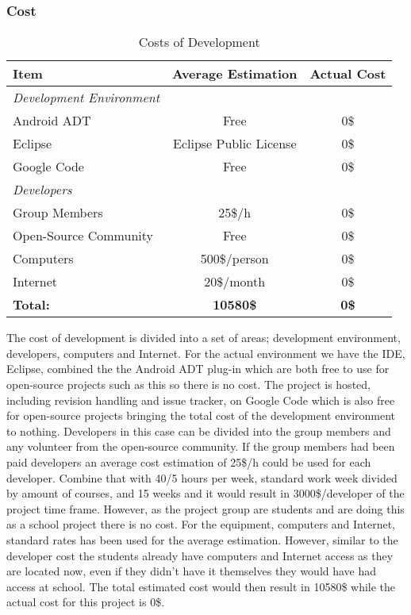 \subsubsection{Cost}
\begin{table}[h]
\label{tab:dev_costs}
\begin{center}
    \begin{tabular}{ | l | c | c |}
    \hline
    \textbf{Item} & \textbf{Average Estimation} & \textbf{Actual Cost} \\ \hline
    \textit{Development Environment} &  &  \\ 
    Android ADT & Free & 0\$ \\ 
    Eclipse & Eclipse Public License\cite{eclipse-cost} & 0\$ \\
    Google Code & Free & 0\$ \\ \hline
    \textit{Developers} &  &  \\
    Group Members & 25\$/h\cite{dev-cost} & 0\$ \\
    Open-Source Community & Free & 0\$ \\ \hline
    Computers & 500\$/person\cite{comp-cost} & 0\$ \\ \hline
    Internet & 20\$/month\cite{internet-cost} & 0\$ \\ \hline \hline
    \textbf{Total:} & \textbf{10580\$} & \textbf{0\$} \\ \hline
    \end{tabular}
    \caption{Costs of Development}
\end{center}
\end{table}
The cost of development is divided into a set of areas; development environment, developers, computers and Internet. For the actual environment we have the IDE, Eclipse, combined the the Android ADT plug-in which are both free to use for open-source projects such as this so there is no cost. The project is hosted, including revision handling and issue tracker, on Google Code which is also free for open-source projects bringing the total cost of the development environment to nothing. Developers in this case can be divided into the group members and any volunteer from the open-source community. If the group members had been paid developers an average cost estimation of 25\$/h could be used for each developer. Combine that with 40/5 hours per week, standard work week divided by amount of courses, and 15 weeks and it would result in 3000\$/developer of the project time frame. However, as the project group are students and are doing this as a school project there is no cost. For the equipment, computers and Internet, standard rates has been used for the average estimation. However, similar to the developer cost the students already have computers and Internet access as they are located now, even if they didn't have it themselves they would have had access at school. The total estimated cost would then result in 10580\$ while the actual cost for this project is 0\$.


